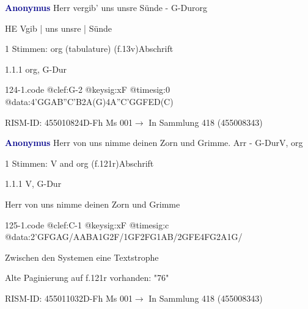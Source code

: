 \documentclass[twocolumn, 12pt]{book}
\begin{document}
\par \vspace{16pt} \textcolor{darkblue}{\textbf{Anonymus  }}\hfillplus{\textbf{[124]}}\newline Herr vergib' uns unsre Sünde - G-Dur\newline org
\par \begin{itshape}[f.13v, at left:] HE Vgib | uns unsre | Sünde\end{itshape} 
\par \textcolor{darkblue}{}  1 Stimmen: org (tabulature)  (f.13v)\newline Abschrift
\par 1.1.1  org, G-Dur  
\begin{filecontents*}{124-1.code}
@clef:G-2
@keysig:xF
@timesig:0
@data:4'GGAB''C'B2A(G)4A''C'GGFED(C)
\end{filecontents*}
\newline %
\par RISM-ID: 455010824\newline D-Fh  Ms 001\newline $\rightarrow$ In Sammlung 418 (455008343)
      
\par \vspace{16pt} \textcolor{darkblue}{\textbf{Anonymus  }}\hfillplus{\textbf{[125]}}\newline Herr von uns nimme deinen Zorn und Grimme. Arr - G-Dur\newline V, org
\par \begin{itshape}\end{itshape} 
\par \textcolor{darkblue}{}  1 Stimmen: V and org  (f.121r)\newline Abschrift
\par 1.1.1  V, G-Dur\newline \begin{footnotesize} Herr von uns nimme deinen Zorn und Grimme \end{footnotesize}  
\begin{filecontents*}{125-1.code}
@clef:C-1
@keysig:xF
@timesig:c
@data:2'GFGAG/AABA1G2F/1GF2FG1AB/2GFE4FG2A1G/
\end{filecontents*}
\newline %
\par Zwischen den Systemen eine Textstrophe
\par Alte Paginierung auf f.121r vorhanden: "76"
\par RISM-ID: 455011032\newline D-Fh  Ms 001\newline $\rightarrow$ In Sammlung 418 (455008343)
      
\end{document}
